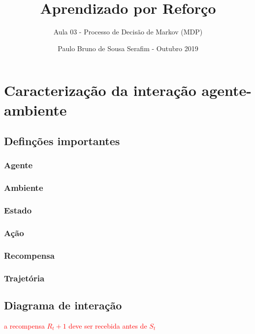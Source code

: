 \documentclass{article}
\title{Aprendizado por Reforço}
\author{Aula 03 - Processo de Decisão de Markov (MDP)}
\date{Paulo Bruno de Sousa Serafim - Outubro 2019}
\begin{document}
\maketitle

\section{Caracterização da interação agente-ambiente}

    \subsection{Definções importantes}
        
        \subsubsection{Agente}
        \subsubsection{Ambiente}
        \subsubsection{Estado}
        \subsubsection{Ação}
        \subsubsection{Recompensa}
        \subsubsection{Trajetória}
        
    \subsection{Diagrama de interação}
    
        \textcolor{red}{a recompensa $R_t+1$ deve ser recebida antes de $S_t$}
    
\end{document}
